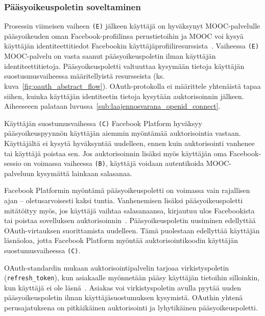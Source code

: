 \documentclass[finnish,gradu]{tktltiki}
\begin{document}

  \subsubsection{Pääsyoikeuspoletin soveltaminen} %
  \label{ssub:ensimmäisen_auktorisoinnin_jälkeen}

  Prosessin viimeisen vaiheen \verb!(E)! jälkeen käyttäjä on hyväksynyt MOOC-palvelulle pääsyoikeuden oman Facebook-profiilinsa perustietoihin ja MOOC voi kysyä käyttäjän identiteettitiedot Facebookin käyttäjäprofiiliresurssista~\cite{facebook_graph_api_user}. Vaiheessa \verb!(E)! MOOC-palvelu on vasta saanut pääsyoikeuspoletin ilman käyttäjän identiteettitietoja. Pääsyoikeuspoletti valtuuttaa kysymään tietoja käyttäjän suostusmusvaiheessa määritellyistä resursseista (ks. kuva~\ref{fig:oauth_abstract_flow}). OAuth-protokolla ei määrittele yhtenäistä tapaa siihen, kuinka käyttäjän identiteetin tietoja kysytään auktorisoinnin jälkeen. Aiheeseeen palataan luvussa~\ref{sub:laajennosvarana_openid_connect}.

   Käyttäjän suostumusvaihessa \verb!(C)! Facebook Platform hyväksyy pääsyoikeuspyynnön käyttäjän aiemmin myöntämää auktorisointia vastaan. Käyttäjältä ei kysytä hyväksyntää uudelleen, ennen kuin auktorisointi vanhenee tai käyttäjä poistaa sen. Jos auktorisoinnin lisäksi myös käyttäjän oma Facebook-sessio on voimassa vaiheessa \verb!(B)!, käyttäjä voidaan autentikoida MOOC-palveluun kysymättä lainkaan salasanaa.

  Facebook Platformin myöntämä pääsyoikeuspoletti on voimassa vain rajallisen ajan -- oletusarvoisesti kaksi tuntia. Vanhenemisen lisäksi pääsyoikeuspoletti mitätöityy myös, jos käyttäjä vaihtaa salasanaansa, kirjautuu ulos Facebookista tai poistaa sovelluksen auktorisoinnin~\cite{facebook_oauth2_expired_tokens}. Pääsyoikeuspoletin uusiminen edellyttää OAuth-virtauksen suorittamista uudelleen. Tämä puolestaan edellyttää käyttäjän läsnäoloa, jotta Facebook Platform myöntää auktorisointikoodin käyttäjän suostumusvaiheessa \verb!(C)!.

  OAuth-standardin mukaan auktorisointipalvelin tarjoaa virkistyspoletin (\verb!refresh_token!), kun asiakaalle myönnetään pääsy käyttäjän tietoihin silloinkin, kun käyttäjä ei ole läsnä~\cite{ietf_oauth2}. Asiakas voi virkistyspoletin avulla pyytää uuden pääsyoikeuspoletin ilman käyttäjäsuostumuksen kysymistä. OAuthin yhtenä perusajatuksena on pitkäikäinen auktorisointi ja lyhytikäinen pääsyoikeuspoletti.
\end{document}
